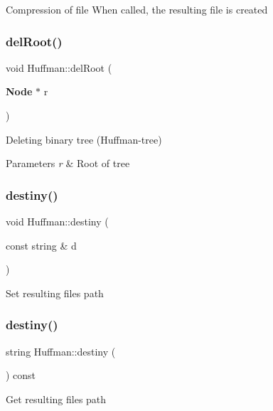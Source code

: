 Compression of file When called, the resulting file is created \mbox{\label{class_huffman_ae994bcb0f59826793e2065b0fd9bd7fb}} 
\subsubsection{del\+Root()}
{\footnotesize\ttfamily void Huffman\+::del\+Root (\begin{DoxyParamCaption}\item[{\textbf{ Node} $\ast$}]{r }\end{DoxyParamCaption})}

Deleting binary tree (Huffman-\/tree) 
\begin{DoxyParams}{Parameters}
{\em r} & Root of tree \\
\hline
\end{DoxyParams}
\mbox{\label{class_huffman_a5daa104bd2cefb4be9befd6140428ba7}} 
\subsubsection{destiny()\hspace{0.1cm}{\footnotesize\ttfamily [1/2]}}
{\footnotesize\ttfamily void Huffman\+::destiny (\begin{DoxyParamCaption}\item[{const string \&}]{d }\end{DoxyParamCaption})\hspace{0.3cm}{\ttfamily [inline]}}

Set resulting file\textquotesingle{}s path \mbox{\label{class_huffman_ab6edbf4822379aaf27834c21b706405f}} 
\subsubsection{destiny()\hspace{0.1cm}{\footnotesize\ttfamily [2/2]}}
{\footnotesize\ttfamily string Huffman\+::destiny (\begin{DoxyParamCaption}{ }\end{DoxyParamCaption}) const\hspace{0.3cm}{\ttfamily [inline]}}

Get resulting file\textquotesingle{}s path \mbox{\label{class_huffman_a7c0595055bea8a499d7750cbbd86e12d}} 
